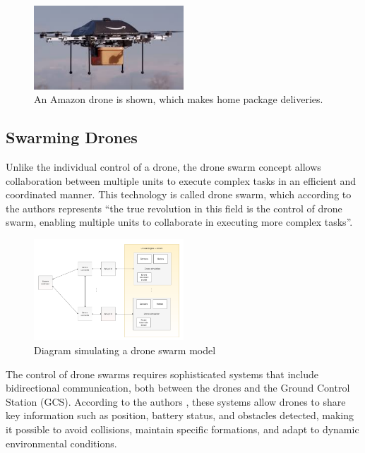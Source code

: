 \begin{figure}[H]
    \centering
    \includegraphics[width=0.5\textwidth]{pictures/drone_aplication_2.jpg}
    \caption{An Amazon drone is shown, which makes home package deliveries. \cite{aplications_drones}}
    \label{fig:drone_applications_2}
\end{figure}

\subsection{Swarming Drones}
Unlike the individual control of a drone, the drone swarm concept allows collaboration between multiple units to execute complex tasks in an efficient and coordinated manner. This technology is called drone swarm, which according to the authors \cite{swarm_industrial} represents “the true revolution in this field is the control of drone swarm, enabling multiple units to collaborate in executing more complex tasks”. 

\begin{figure}[H]
    \centering
    \includegraphics[width=0.5\textwidth]{pictures/swarm_diagram.png}
    \caption{Diagram simulating a drone swarm model}
    \label{fig:swarming_drones}
\end{figure}

The control of drone swarms requires sophisticated systems that include bidirectional communication, both between the drones and the Ground Control Station (GCS). According to the authors \cite{swarming_drones}, these systems allow drones to share key information such as position, battery status, and obstacles detected, making it possible to avoid collisions, maintain specific formations, and adapt to dynamic environmental conditions.

